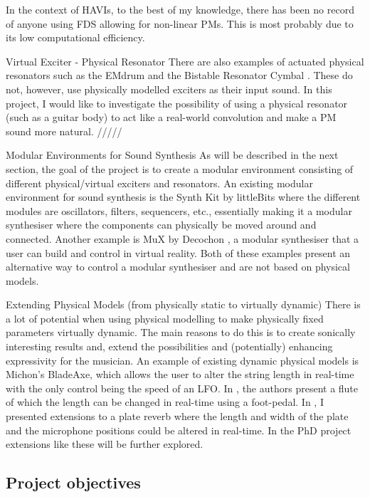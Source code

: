 In the context of HAVIs, to the best of my knowledge, there has been no record of anyone using FDS allowing for non-linear PMs. This is most probably due to its low computational efficiency. 

Virtual Exciter - Physical Resonator
There are also examples of actuated physical resonators such as the EMdrum \cite{Rector2014} and the Bistable Resonator Cymbal \cite{Piepenbrink2015}. These do not, however, use physically modelled exciters as their input sound. In this project, I would like to investigate the possibility of using a physical resonator (such as a guitar body) to act like a real-world convolution and make a PM sound more natural.
/////

Modular Environments for Sound Synthesis
As will be described in the next section, the goal of the project is to create a modular environment consisting of different physical/virtual exciters and resonators. An existing modular environment for sound synthesis is the Synth Kit by littleBits \cite{littleBits2019} where the different modules are oscillators, filters, sequencers, etc., essentially making it a modular synthesiser where the components can physically be moved around and connected. Another example is MuX by Decochon \cite{MuX2019}, a modular synthesiser that a user can build and control in virtual reality. Both of these examples present an alternative way to control a modular synthesiser and are not based on physical models.

Extending Physical Models (from physically static to virtually dynamic)
There is a lot of potential when using physical modelling to make physically fixed parameters virtually dynamic. The main reasons to do this is to 
create sonically interesting results and,
extend the possibilities and (potentially) enhancing expressivity for the musician.
An example of existing dynamic physical models is Michon’s BladeAxe, which allows the user to alter the string length in real-time with the only control being the speed of an LFO. In \cite{Gelineck2005}, the authors present a flute of which the length can be changed in real-time using a foot-pedal. In \cite{Willemsen2017}, I presented extensions to a plate reverb where the length and width of the plate and the microphone positions could be altered in real-time. In the PhD project extensions like these will be  further explored.

\subsection{Project objectives}

